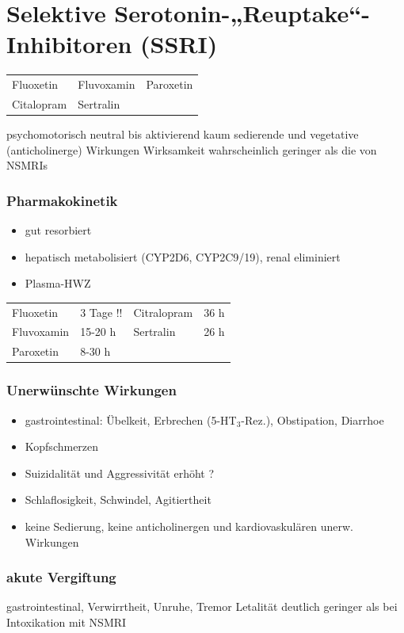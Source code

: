 \documentclass[10pt,a4paper]{report}
\begin{document}
\section{Selektive Serotonin-„Reuptake“-Inhibitoren (SSRI)} %
\label{sec:selektive_serotonin_reuptake_inhibitoren_ssri_}
\begin{tabularx}{\textwidth}{XXX}
Fluoxetin&Fluvoxamin&Paroxetin\\
Citalopram&Sertralin\\
\end{tabularx}
psychomotorisch neutral bis aktivierend kaum sedierende und vegetative (anticholinerge) Wirkungen Wirksamkeit wahrscheinlich geringer als die von NSMRIs
\subsubsection{Pharmakokinetik} %
\label{ssub:pharmakokinetik}
\begin{itemize}
	\item gut resorbiert
	\item hepatisch metabolisiert (CYP2D6, CYP2C9/19), renal eliminiert
	\item Plasma-HWZ
\end{itemize}
\begin{tabularx}{\textwidth}{lXlX}
Fluoxetin&3 Tage !!&Citralopram&36 h\\
Fluvoxamin&15-20 h&Sertralin&26 h\\
Paroxetin&8-30 h\\
\end{tabularx}
\subsubsection{Unerwünschte Wirkungen} %
\label{ssub:unerw_nschte_wirkungen}
\begin{itemize}
	\item gastrointestinal: Übelkeit, Erbrechen (5-HT$_3$-Rez.), Obstipation, Diarrhoe
	\item Kopfschmerzen
	\item Suizidalität und Aggressivität erhöht ?
	\item Schlaflosigkeit, Schwindel, Agitiertheit
	\item keine Sedierung, keine anticholinergen und kardiovaskulären unerw. Wirkungen
\end{itemize}
\subsubsection{akute Vergiftung} %
\label{sub:akute_vergiftung}
gastrointestinal, Verwirrtheit, Unruhe, Tremor Letalität deutlich geringer als bei Intoxikation mit NSMRI 
\end{document}
